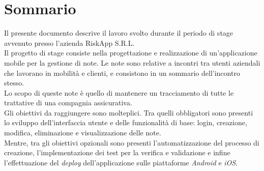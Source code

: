 \cleardoublepage
{}
{}
\begingroup
\let\clearpage\relax
\let\cleardoublepage\relax
\let\cleardoublepage\relax

\chapter*{Sommario}

Il presente documento descrive il lavoro svolto durante il periodo di stage avvenuto presso l'azienda RiskApp S.R.L. \\

\noindent Il progetto di stage consiste nella progettazione e realizzazione di un'applicazione mobile per la gestione di note. Le note sono relative a incontri tra utenti aziendali che lavorano in mobilità e clienti, e consistono in un sommario dell'incontro stesso.\\
Lo scopo di queste note è quello di mantenere un tracciamento di tutte le trattative di una compagnia assicurativa.\\


\noindent Gli obiettivi da raggiungere sono molteplici. Tra quelli obbligatori sono presenti lo sviluppo dell'interfaccia utente e delle funzionalità di base: login, creazione, modifica, eliminazione e visualizzazione delle note.\\
Mentre, tra gli obiettivi opzionali sono presenti l'automatizzazione del processo di creazione, l'implementazione dei test per la verifica e validazione e infine l'effettuazione del \emph{deploy} dell'applicazione sulle piattaforme \emph{Android} e \emph{iOS}.\\




\endgroup

\vfill
